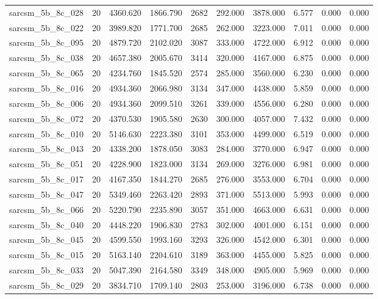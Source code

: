 \begin{tabular}{lrrrrrrrrr}
sarcsm\_5b\_8c\_028 & 20 & 4360.620 & 1866.790 & 2682 & 292.000 & 3878.000 & 6.577 & 0.000 & 0.000 \\
sarcsm\_5b\_8c\_022 & 20 & 3989.820 & 1771.700 & 2685 & 262.000 & 3223.000 & 7.011 & 0.000 & 0.000 \\
sarcsm\_5b\_8c\_095 & 20 & 4879.720 & 2102.020 & 3087 & 333.000 & 4722.000 & 6.912 & 0.000 & 0.000 \\
sarcsm\_5b\_8c\_038 & 20 & 4657.380 & 2005.670 & 3414 & 320.000 & 4167.000 & 6.875 & 0.000 & 0.000 \\
sarcsm\_5b\_8c\_065 & 20 & 4234.760 & 1845.520 & 2574 & 285.000 & 3560.000 & 6.230 & 0.000 & 0.000 \\
sarcsm\_5b\_8c\_016 & 20 & 4934.360 & 2066.980 & 3134 & 347.000 & 4438.000 & 5.859 & 0.000 & 0.000 \\
sarcsm\_5b\_8c\_006 & 20 & 4934.360 & 2099.510 & 3261 & 339.000 & 4556.000 & 6.280 & 0.000 & 0.000 \\
sarcsm\_5b\_8c\_072 & 20 & 4370.530 & 1905.580 & 2630 & 300.000 & 4057.000 & 7.432 & 0.000 & 0.000 \\
sarcsm\_5b\_8c\_010 & 20 & 5146.630 & 2223.380 & 3101 & 353.000 & 4499.000 & 6.519 & 0.000 & 0.000 \\
sarcsm\_5b\_8c\_043 & 20 & 4338.200 & 1878.050 & 3083 & 284.000 & 3770.000 & 6.947 & 0.000 & 0.000 \\
sarcsm\_5b\_8c\_051 & 20 & 4228.900 & 1823.000 & 3134 & 269.000 & 3276.000 & 6.981 & 0.000 & 0.000 \\
sarcsm\_5b\_8c\_017 & 20 & 4167.350 & 1844.270 & 2685 & 276.000 & 3553.000 & 6.704 & 0.000 & 0.000 \\
sarcsm\_5b\_8c\_047 & 20 & 5349.460 & 2263.420 & 2893 & 371.000 & 5513.000 & 5.993 & 0.000 & 0.000 \\
sarcsm\_5b\_8c\_066 & 20 & 5220.790 & 2235.890 & 3057 & 351.000 & 4663.000 & 6.631 & 0.000 & 0.000 \\
sarcsm\_5b\_8c\_040 & 20 & 4448.220 & 1906.830 & 2783 & 302.000 & 4001.000 & 6.151 & 0.000 & 0.000 \\
sarcsm\_5b\_8c\_045 & 20 & 4599.550 & 1993.160 & 3293 & 326.000 & 4542.000 & 6.301 & 0.000 & 0.000 \\
sarcsm\_5b\_8c\_015 & 20 & 5163.140 & 2204.610 & 3189 & 363.000 & 4455.000 & 5.825 & 0.000 & 0.000 \\
sarcsm\_5b\_8c\_033 & 20 & 5047.390 & 2164.580 & 3349 & 348.000 & 4905.000 & 5.969 & 0.000 & 0.000 \\
sarcsm\_5b\_8c\_029 & 20 & 3834.710 & 1709.140 & 2803 & 253.000 & 3196.000 & 6.738 & 0.000 & 0.000 \\

\end{tabular}
